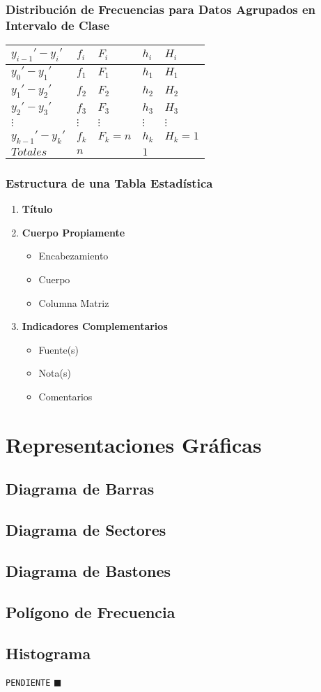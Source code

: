 \subsubsection{Distribución de Frecuencias para Datos Agrupados en Intervalo de Clase}
\begin{center}
\begin{tabular}{|C{1.5cm}|C{1.5cm}|C{1.5cm}|C{1.5cm}|C{1.5cm}|}
\hline
$y_{i-1}'-y_i'$ & $f_i$ & $F_i$ & $h_i$ & $H_i$\\ \hline
$y_0'-y_1'$ & $f_1$ & $F_1$ & $h_1$ & $H_1$\\ \hline
$y_1'-y_2'$ & $f_2$ & $F_2$ & $h_2$ & $H_2$\\ \hline
$y_2'-y_3'$ & $f_3$ & $F_3$ & $h_3$ & $H_3$\\ \hline
$\vdots$ & $\vdots$ & $\vdots$ & $\vdots$ & $\vdots$ \\ \hline
$y_{k-1}'-y_k'$ & $f_k$ & $F_k=n$ & $h_k$ & $H_k=1$ \\ \hline
$Totales$ & $n$ &  & $1$ & \\ 
\hline
\end{tabular}
\end{center}
\subsubsection{Estructura de una Tabla Estadística}
\begin{enumerate}
\item \textbf{Título}
\item \textbf{Cuerpo Propiamente }
\begin{itemize}
\item Encabezamiento
\item Cuerpo
\item Columna Matriz
\end{itemize}
\item \textbf{Indicadores Complementarios}
\begin{itemize}
\item Fuente(s)
\item Nota(s)
\item Comentarios
\end{itemize}
\end{enumerate}
\section{Representaciones Gráficas}
\subsection{Diagrama de Barras}
\subsection{Diagrama de Sectores}
\subsection{Diagrama de Bastones}
\subsection{Polígono de Frecuencia}
\subsection{Histograma}
\texttt{PENDIENTE} $\blacksquare$